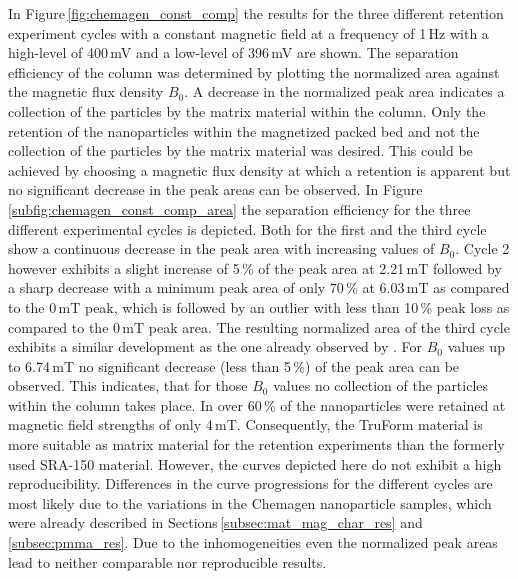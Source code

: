 In Figure\,\ref{fig:chemagen_const_comp} the results for the three different retention experiment cycles with a constant magnetic field at a frequency of 1\,Hz with a high-level of 400\,mV and a low-level of 396\,mV are shown. The separation efficiency of the column was determined by plotting the normalized area against the magnetic flux density $B_{0}$. A decrease in the normalized peak area indicates a collection of the particles by the matrix material within the column. Only the retention of the nanoparticles within the magnetized packed bed and not the collection of the particles by the matrix material was desired. This could be achieved by choosing a magnetic flux density at which a retention is apparent but no significant decrease in the peak areas can be observed. In Figure\,\ref{subfig:chemagen_const_comp_area} the separation efficiency for the three different experimental cycles is depicted. Both for the first and the third cycle show a continuous decrease in the peak area with increasing values of $B_{0}$. Cycle 2 however exhibits a slight increase of 5\,\% of the peak area at 2.21\,mT followed by a sharp decrease with a minimum peak area of only 70\,\% at 6.03\,mT as compared to the 0\,mT peak, which is followed by an outlier with less than 10\,\% peak loss as compared to the 0\,mT peak area. The resulting normalized area of the third cycle exhibits a similar development as the one already observed by \cite{AndreMaster}. For $B_{0}$ values up to 6.74\,mT no significant decrease (less than 5\,\%) of the peak area can be observed. This indicates, that for those $B_{0}$ values no collection of the particles within the column takes place. In \cite{AndreMaster} over 60\,\% of the nanoparticles were retained at magnetic field strengths of only 4\,mT. Consequently, the TruForm material is more suitable as matrix material for the retention experiments than the formerly used SRA-150 material. However, the curves depicted here do not exhibit a high reproducibility.  Differences in the curve progressions for the different cycles are most likely due to the variations in the Chemagen nanoparticle samples, which were already described in Sections\,\ref{subsec:mat_mag_char_res} and \ref{subsec:pmma_res}. Due to the inhomogeneities even the normalized peak areas lead to neither comparable nor reproducible results.     

